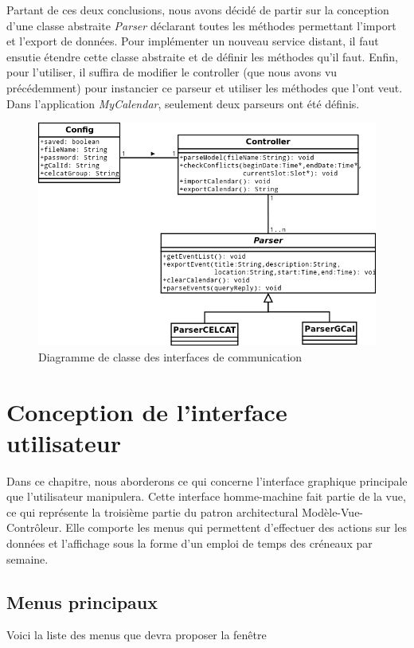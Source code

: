 	Partant de ces deux conclusions, nous avons décidé de partir sur la conception d'une classe abstraite \emph{Parser} déclarant toutes les méthodes permettant l'import et l'export de données. Pour implémenter un nouveau service distant, il faut ensutie étendre cette classe abstraite et de définir les méthodes qu'il faut. Enfin, pour l'utiliser, il suffira de modifier le controller (que nous avons vu précédemment) pour instancier ce parseur et utiliser les méthodes que l'ont veut.\\
	
	Dans l'application \emph{MyCalendar}, seulement deux parseurs ont été définis.
	\begin{figure}
		\centering
		\includegraphics[scale=0.65]{diagclasses_parser.png}
		\caption{Diagramme de classe des interfaces de communication}
	\end{figure}
	\FloatBarrier

\chapter{Conception de l'interface utilisateur}
    Dans ce chapitre, nous aborderons ce qui concerne l'interface graphique principale que l'utilisateur manipulera. Cette interface homme-machine fait partie de la vue, ce qui représente la troisième partie du patron architectural Modèle-Vue-Contrôleur. Elle comporte les menus qui permettent d'effectuer des actions sur les données et l'affichage sous la forme d'un emploi de temps des créneaux par semaine.
    
    
    

    \section{Menus principaux}
        Voici la liste des menus que devra proposer la fenêtre 

